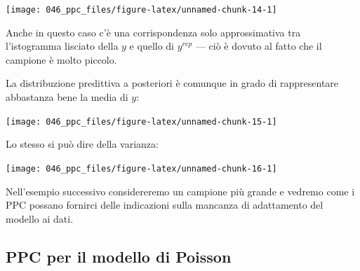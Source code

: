 \documentclass[
  10pt,
  italian,
  a4paper,
  extrafontsizes,onecolumn,openright
  ]{memoir}
\newenvironment{Shaded}{\begin{snugshade}}{\end{snugshade}}
\newcommand{\AttributeTok}[1]{\textcolor[rgb]{0.77,0.63,0.00}{#1}}
\newcommand{\DecValTok}[1]{\textcolor[rgb]{0.00,0.00,0.81}{#1}}
\newcommand{\FunctionTok}[1]{\textcolor[rgb]{0.00,0.00,0.00}{#1}}
\newcommand{\NormalTok}[1]{#1}
\newcommand{\SpecialCharTok}[1]{\textcolor[rgb]{0.00,0.00,0.00}{#1}}
\newcommand{\StringTok}[1]{\textcolor[rgb]{0.31,0.60,0.02}{#1}}
\begin{document}
\begin{Shaded}
\end{Shaded}

\begin{center}\texttt{[image: 046\_ppc\_files/figure-latex/unnamed-chunk-14-1]} \end{center}

Anche in questo caso c'è una corrispondenza solo approssimativa tra l'istogramma lisciato della \(y\) e quello di \(y^{rep}\) --- ciò è dovuto al fatto che il campione è molto piccolo.

La distribuzione predittiva a posteriori è comunque in grado di rappresentare abbastanza bene la media di \(y\):

\begin{Shaded}
\end{Shaded}

\begin{center}\texttt{[image: 046\_ppc\_files/figure-latex/unnamed-chunk-15-1]} \end{center}

\noindent
Lo stesso si può dire della varianza:

\begin{Shaded}
\end{Shaded}

\begin{center}\texttt{[image: 046\_ppc\_files/figure-latex/unnamed-chunk-16-1]} \end{center}

Nell'esempio successivo considereremo un campione più grande e vedremo come i PPC possano fornirci delle indicazioni sulla mancanza di adattamento del modello ai dati.

\hypertarget{ppc-per-il-modello-di-poisson}{%
\subsection{PPC per il modello di Poisson}\label{ppc-per-il-modello-di-poisson}}
\end{document}
